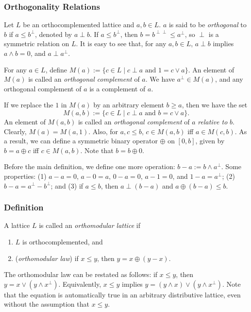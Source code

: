 \documentclass[12pt]{article}
\begin{document}
\subsubsection*{Orthogonality Relations}
Let $L$ be an orthocomplemented lattice and $a,b\in L$.  $a$ is said to be \emph{orthogonal} to $b$ if $a\le b^{\perp}$, denoted by $a\perp b$.  If $a\le b^{\perp}$, then $b=b^{\perp\perp}\le a^{\perp}$, so $\perp$ is a symmetric relation on $L$.  It is easy to see that, for any $a,b\in L$, $a\perp b$ implies $a\wedge b=0$, and $a\perp a^{\perp}$.  

For any $a\in L$, define $M(a):=\lbrace c\in L\mid c\perp a\mbox{ and }1=c \vee a\rbrace$.  An element of $M(a)$ is called an \emph{orthogonal complement} of $a$.  We have $a^{\perp}\in M(a)$, and any orthogonal complement of $a$ is a complement of $a$.

If we replace the $1$ in $M(a)$ by an arbitrary element $b\ge a$, then we have the set $$M(a,b):=\lbrace c\in L\mid c\perp a\mbox{ and }b=c \vee a\rbrace.$$
An element of $M(a,b)$ is called an \emph{orthogonal complement} of $a$ \emph{relative to} $b$.  Clearly, $M(a)=M(a,1)$.  Also, for $a,c\le b$, $c\in M(a,b)$ iff $a\in M(c,b)$.  As a result, we can define a symmetric binary operator $\oplus$ on $[0,b]$, given by $b=a\oplus c$ iff $c\in M(a,b)$.  Note that $b=b\oplus 0$.

Before the main definition, we define one more operation: $b-a:=b\wedge a^{\perp}$.  Some properties: (1) $a-a=0$, $a-0=a$, $0-a=0$, $a-1=0$, and $1-a=a^{\perp}$; (2) $b-a=a^{\perp}-b^{\perp}$; and (3) if $a\le b$, then $a\perp (b-a)$ and $a\oplus (b-a)\le b$.

\subsubsection*{Definition}  
A lattice $L$ is called an \emph{orthomodular lattice} if 
\begin{enumerate}
\item $L$ is orthocomplemented, and
\item (\emph{orthomodular law}) if $x\le y$, then $y=x\oplus (y-x)$.
\end{enumerate}

The orthomodular law can be restated as follows: if $x\le y$, then 
$y=x\vee (y\wedge x^{\perp})$.  Equivalently, $x\le y$ implies $y=(y\wedge x)\vee (y\wedge x^{\perp})$.  Note that the equation is automatically true in an arbitrary distributive lattice, even without the assumption that $x\le y$.
\end{document}
